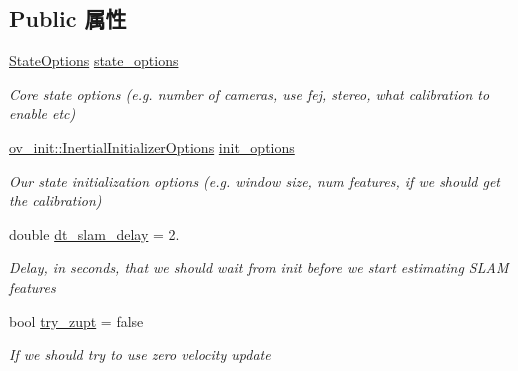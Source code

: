 \subsection*{Public 属性}
\begin{DoxyCompactItemize}
\item 
\mbox{\label{structov__msckf_1_1VioManagerOptions_a578756373f9bcd2eadae31c419fb8c43}} 
\hyperlink{structov__msckf_1_1StateOptions}{State\+Options} \hyperlink{structov__msckf_1_1VioManagerOptions_a578756373f9bcd2eadae31c419fb8c43}{state\+\_\+options}
\begin{DoxyCompactList}\small\item\em Core state options (e.\+g. number of cameras, use fej, stereo, what calibration to enable etc) \end{DoxyCompactList}\item 
\mbox{\label{structov__msckf_1_1VioManagerOptions_aeab967a61ff3c317e7d1d30ab61c70cc}} 
\hyperlink{structov__init_1_1InertialInitializerOptions}{ov\+\_\+init\+::\+Inertial\+Initializer\+Options} \hyperlink{structov__msckf_1_1VioManagerOptions_aeab967a61ff3c317e7d1d30ab61c70cc}{init\+\_\+options}
\begin{DoxyCompactList}\small\item\em Our state initialization options (e.\+g. window size, num features, if we should get the calibration) \end{DoxyCompactList}\item 
\mbox{\label{structov__msckf_1_1VioManagerOptions_ae921221a9db709f06fbd7379e3430bf8}} 
double \hyperlink{structov__msckf_1_1VioManagerOptions_ae921221a9db709f06fbd7379e3430bf8}{dt\+\_\+slam\+\_\+delay} = 2.
\begin{DoxyCompactList}\small\item\em Delay, in seconds, that we should wait from init before we start estimating S\+L\+AM features \end{DoxyCompactList}\item 
\mbox{\label{structov__msckf_1_1VioManagerOptions_a92fe206a83fc4b6c79b88a19c7ff7f3a}} 
bool \hyperlink{structov__msckf_1_1VioManagerOptions_a92fe206a83fc4b6c79b88a19c7ff7f3a}{try\+\_\+zupt} = false
\begin{DoxyCompactList}\small\item\em If we should try to use zero velocity update \end{DoxyCompactList}\item 

\end{DoxyCompactItemize}
